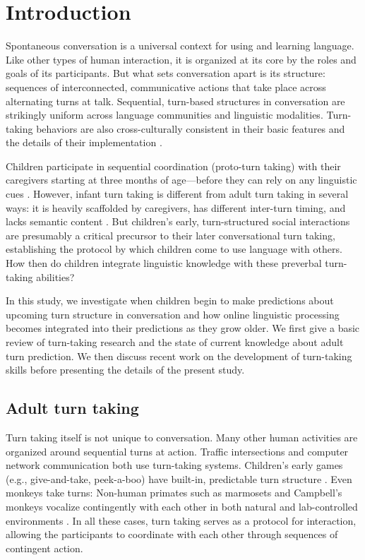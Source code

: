\documentclass[authoryear, 12pt]{elsarticle}
\begin{document}
\linenumbers

\section*{Introduction}
\label{sec:intro}

Spontaneous conversation is a universal context for using and learning language. Like other types of human interaction, it is organized at its core by the roles and goals of its participants. But what sets conversation apart is its structure: sequences of interconnected, communicative actions that take place across alternating turns at talk. Sequential, turn-based structures in conversation are strikingly uniform across language communities and linguistic modalities. Turn-taking behaviors are also cross-culturally consistent in their basic features and the details of their implementation \citep{de-vos2015, dingemanse2013, stivers2009}.

Children participate in sequential coordination (proto-turn taking) with their caregivers starting at three months of age---before they can rely on any linguistic cues \citep[see, among others, ][]{bateson1975, hilbrink2015, jaffe2001, snow1977}. However, infant turn taking is different from adult turn taking in several ways: it is heavily scaffolded by caregivers, has different inter-turn timing, and lacks semantic content \citep{hilbrink2015, jaffe2001}. But children's early, turn-structured social interactions are presumably a critical precursor to their later conversational turn taking, establishing the protocol by which children come to use language with others. How then do children integrate linguistic knowledge with these preverbal turn-taking abilities?

In this study, we investigate when children begin to make predictions about upcoming turn structure in conversation and how online linguistic processing becomes integrated into their predictions as they grow older. We first give a basic review of turn-taking research and the state of current knowledge about adult turn prediction. We then discuss recent work on the development of turn-taking skills before presenting the details of the present study.

\subsection*{Adult turn taking}

Turn taking itself is not unique to conversation. Many other human activities are organized around sequential turns at action. Traffic intersections and computer network communication both use turn-taking systems. Children's early games (e.g., give-and-take, peek-a-boo) have built-in, predictable turn structure \citep{ratner1978, ross1987}. Even monkeys take turns: Non-human primates such as marmosets and Campbell's monkeys vocalize contingently with each other in both natural and lab-controlled environments \citep{lemasson2011, takahashi2013}. In all these cases, turn taking serves as a protocol for interaction, allowing the participants to coordinate with each other through sequences of contingent action.
\end{document}
